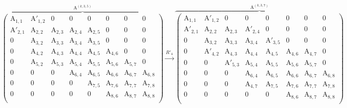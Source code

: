 \documentclass{article}
\newcommand\matA{\boldsymbol{\mathrm{A}}}
\begin{document}
\begingroup
\setlength\arraycolsep{1.5pt}
\begin{align}
    \label{eq:rotation_r_i_prime}
    \overbrace{
    \begin{pmatrix}
        \matA_{1,1}  & \matA'_{1,2}  & 0   & 0             & 0           & 0           & 0           & 0           \\
        \matA'_{2,1}  & \matA_{2,2}  &\matA_{2,3}   & \matA_{2,4}   & \boxed{\matA_{2,5}}           & 0           & 0           & 0           \\
        0  & \matA_{3,2}  &\matA_{3,3}   & \matA_{3,4}   & \matA_{3,5} & 0           & 0           & 0           \\
        0            & \matA_{4,2}  &\matA_{4,3}   & \matA_{4,4}   & \matA_{4,5} & \matA_{4,6} & 0           & 0           \\
        0            & \boxed{\matA_{5,2}} &\matA_{5,3}   & \matA_{5,4}   & \matA_{5,5} & \matA_{5,6} & \matA_{5,7} & 0           \\
        0            & 0            & 0            & \matA_{6,4}   & \matA_{6,5} & \matA_{6,6} & \matA_{6,7} & \matA_{6,8} \\
        0            & 0            & 0            & 0             & \matA_{7,5} & \matA_{7,6} & \matA_{7,7} & \matA_{7,8} \\
        0            & 0            & 0            & 0             & 0           & \matA_{8,6} & \matA_{8,7} & \matA_{8,8} \\
    \end{pmatrix}
    }^{
        \matA^{(k,3,5)}
    }
    \stackrel{R'_4}{\longrightarrow}
    \overbrace{
        \begin{pmatrix}
            \matA_{1,1}  & \matA'_{1,2} & 0            & 0                   & 0           & 0           & 0           & 0           \\
            \matA'_{2,1} & \matA_{2,2}  &\matA_{2,3}   & \matA'_{2,4}        & 0           & 0           & 0           & 0           \\
            0            & \matA_{3,2}  &\matA_{3,3}   & \matA_{3,4}         & \matA'_{3,5} & 0           & 0           & 0           \\
            0            & \matA'_{4,2} &\matA_{4,3}   & \matA_{4,4}         & \matA_{4,5} & \matA_{4,6} & \boxed{\matA_{4,7}} & 0           \\
            0            & 0            &\matA'_{5,3}  & \matA_{5,4}         & \matA_{5,5} & \matA_{5,6} & \matA_{5,7} & 0           \\
            0            & 0            & 0            & \matA_{6,4}         & \matA_{6,5} & \matA_{6,6} & \matA_{6,7} & \matA_{6,8} \\
            0            & 0            & 0            & \boxed{\matA_{4,7}} & \matA_{7,5} & \matA_{7,6} & \matA_{7,7} & \matA_{7,8} \\
            0            & 0            & 0            & 0                   & 0           & \matA_{8,6} & \matA_{8,7} & \matA_{8,8} \\
        \end{pmatrix}
    }^{
        \matA^{(k,3,7)}
    }
\end{align}
\endgroup
\end{document}
